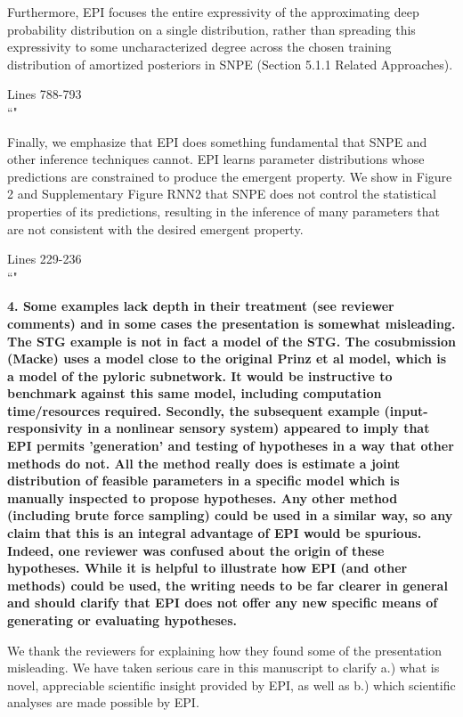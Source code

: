\documentclass[11pt,a4paper]{article}
\begin{document}
Furthermore, EPI focuses the entire expressivity of the approximating deep probability distribution on a single distribution, rather than spreading this expressivity to some uncharacterized degree across the chosen training distribution of amortized posteriors in SNPE (Section 5.1.1 Related Approaches).

\begin{displayquote}
Lines 788-793\\
``"
\end{displayquote}
 
Finally, we emphasize that EPI does something fundamental that SNPE and other inference techniques cannot.  EPI learns parameter distributions whose predictions are constrained to produce the emergent property.  We show in Figure 2 and Supplementary Figure RNN2 that SNPE does not control the statistical properties of its predictions, resulting in the inference of many parameters that are not consistent with the desired emergent property.

\begin{displayquote}
Lines 229-236\\
``"
\end{displayquote}

\textbf{4. Some examples lack depth in their treatment (see reviewer comments) and in some cases the presentation is somewhat misleading. The STG example is not in fact a model of the STG. The cosubmission (Macke) uses a model close to the original Prinz et al model, which is a model of the pyloric subnetwork. It would be instructive to benchmark against this same model, including computation time/resources required. Secondly, the subsequent example (input-responsivity in a nonlinear sensory system) appeared to imply that EPI permits 'generation' and testing of hypotheses in a way that other methods do not. All the method really does is estimate a joint distribution of feasible parameters in a specific model which is manually inspected to propose hypotheses. Any other method (including brute force sampling) could be used in a similar way, so any claim that this is an integral advantage of EPI would be spurious. Indeed, one reviewer was confused about the origin of these hypotheses. While it is helpful to illustrate how EPI (and other methods) could be used, the writing needs to be far clearer in general and should clarify that EPI does not offer any new specific means of generating or evaluating hypotheses.}

We thank the reviewers for explaining how they found some of the
presentation misleading.  We have taken serious care in this manuscript to clarify a.)
what is novel, appreciable scientific insight provided by EPI, as well as b.) which scientific
analyses are made possible by EPI.
\end{document}

